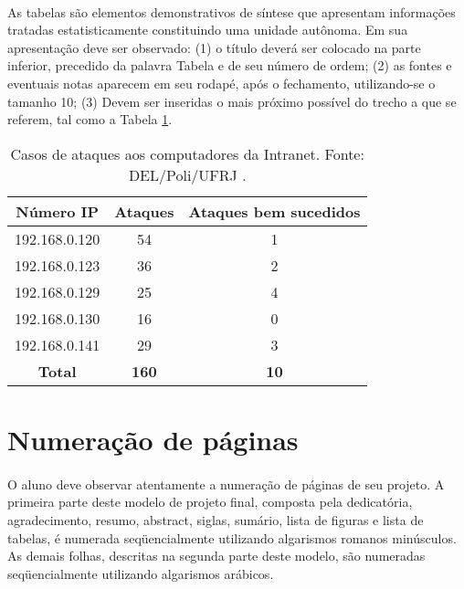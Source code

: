 \paragraph{}As tabelas são elementos demonstrativos de síntese que apresentam informações tratadas estatisticamente constituindo uma unidade autônoma. Em sua apresentação deve ser observado: (1) o título deverá ser colocado na parte inferior, precedido da palavra Tabela e de seu número de ordem; (2) as fontes e eventuais notas aparecem em seu rodapé, após o fechamento, utilizando-se o tamanho 10; (3) Devem ser inseridas o mais próximo possível do trecho a que se referem, tal como a Tabela \ref{TabIntranet}.

\begin{table}[h]
	\begin{center}
	  \caption{Casos de ataques aos computadores da Intranet. Fonte: DEL/Poli/UFRJ \cite{Meyer97}.}
		\begin{tabular}{|c|c|c|}\hline
		  \textbf{Número I}P & \textbf{Ataques} & \textbf{Ataques bem sucedidos} \\ \hline \vspace{-1.0mm}
		  192.168.0.120 & 54 & 1 \\ \hline \vspace{-1.0mm}
		  192.168.0.123 & 36 & 2 \\ \hline \vspace{-1.0mm}
		  192.168.0.129 & 25 & 4 \\ \hline \vspace{-1.0mm}
		  192.168.0.130 & 16 & 0 \\ \hline \vspace{-1.0mm}
		  192.168.0.141 & 29 & 3 \\ \hline \vspace{-1.0mm}
		  \textbf{Total} & \textbf{160} & \textbf{10} \\ \hline
		\end{tabular}
	\end{center}
	\label{TabIntranet}
\end{table}

\section{Numeração de páginas}

\paragraph{}O aluno deve observar atentamente a numeração de páginas de seu projeto. A primeira parte deste modelo de projeto final, composta pela dedicatória, agradecimento, resumo, abstract, siglas, sumário, lista de figuras e lista de tabelas, é numerada seqüencialmente utilizando algarismos romanos minúsculos. As demais folhas, descritas na segunda parte deste modelo, são numeradas seqüencialmente utilizando algarismos arábicos.

